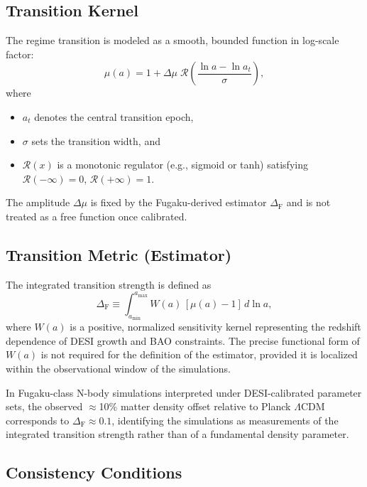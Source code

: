 \documentclass[12pt,a4paper]{article}
\newcommand{\DeltaF}{\Delta_{\mathrm{F}}}
\newcommand{\Deltamu}{\Delta\mu}
\begin{document}
\subsection{Transition Kernel}

The regime transition is modeled as a smooth, bounded function in log-scale factor:
\begin{equation}
\mu(a) = 1 + \Deltamu \; \mathcal{R}\!\left(\frac{\ln a - \ln a_t}{\sigma}\right),
\label{eq:transition_kernel}
\end{equation}
where
\begin{itemize}[leftmargin=2em,itemsep=0.3em]
    \item $a_t$ denotes the central transition epoch,
    \item $\sigma$ sets the transition width, and
    \item $\mathcal{R}(x)$ is a monotonic regulator (e.g., sigmoid or tanh) satisfying $\mathcal{R}(-\infty) = 0$, $\mathcal{R}(+\infty) = 1$.
\end{itemize}
The amplitude $\Deltamu$ is fixed by the Fugaku-derived estimator $\DeltaF$ and is not treated as a free function once calibrated.

\subsection{Transition Metric (Estimator)}

The integrated transition strength is defined as
\begin{equation}
\DeltaF \equiv \int_{a_{\min}}^{a_{\max}} W(a)\,[\mu(a)-1]\,d\ln a,
\label{eq:estimator}
\end{equation}
where $W(a)$ is a positive, normalized sensitivity kernel representing the redshift dependence of DESI growth and BAO constraints. The precise functional form of $W(a)$ is not required for the definition of the estimator, provided it is localized within the observational window of the simulations.

In Fugaku-class N-body simulations interpreted under DESI-calibrated parameter sets, the observed $\approx$10\% matter density offset relative to Planck $\Lambda$CDM corresponds to $\DeltaF \approx 0.1$, identifying the simulations as measurements of the integrated transition strength rather than of a fundamental density parameter.

\subsection{Consistency Conditions}
\end{document}
